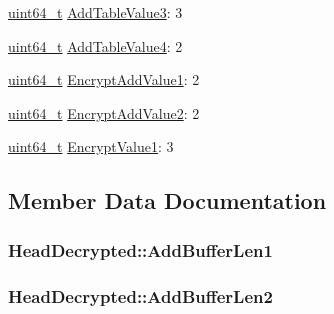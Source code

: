 \begin{DoxyCompactItemize}
\item 
\hyperlink{stdint_8h_aec6fcb673ff035718c238c8c9d544c47}{uint64\+\_\+t} \hyperlink{structHeadDecrypted_a5d1e764b36c8ac404dae50f88a32c7ad}{Add\+Table\+Value3}\+: 3
\item 
\hyperlink{stdint_8h_aec6fcb673ff035718c238c8c9d544c47}{uint64\+\_\+t} \hyperlink{structHeadDecrypted_a9680d801f465e94e79747dbd4cc60d3a}{Add\+Table\+Value4}\+: 2
\item 
\hyperlink{stdint_8h_aec6fcb673ff035718c238c8c9d544c47}{uint64\+\_\+t} \hyperlink{structHeadDecrypted_a5351f06e5c6e8830a3f7d48bae5b62a6}{Encrypt\+Add\+Value1}\+: 2
\item 
\hyperlink{stdint_8h_aec6fcb673ff035718c238c8c9d544c47}{uint64\+\_\+t} \hyperlink{structHeadDecrypted_aecd46a361fa6ff8dd887cac6fd59563e}{Encrypt\+Add\+Value2}\+: 2
\item 
\hyperlink{stdint_8h_aec6fcb673ff035718c238c8c9d544c47}{uint64\+\_\+t} \hyperlink{structHeadDecrypted_ae1e522d691d3039f29a31f5f3183e99a}{Encrypt\+Value1}\+: 3
\end{DoxyCompactItemize}


\subsection{Member Data Documentation}
\subsubsection[{\texorpdfstring{Add\+Buffer\+Len1}{AddBufferLen1}}]{ Head\+Decrypted\+::\+Add\+Buffer\+Len1}\hypertarget{structHeadDecrypted_a6e2d7d7d03db6ac7b8ed153a4819f449}{}\label{structHeadDecrypted_a6e2d7d7d03db6ac7b8ed153a4819f449}
\subsubsection[{\texorpdfstring{Add\+Buffer\+Len2}{AddBufferLen2}}]{ Head\+Decrypted\+::\+Add\+Buffer\+Len2}\hypertarget{structHeadDecrypted_ab8a0200f54f3efee5aa20fad048185b0}{}\label{structHeadDecrypted_ab8a0200f54f3efee5aa20fad048185b0}
